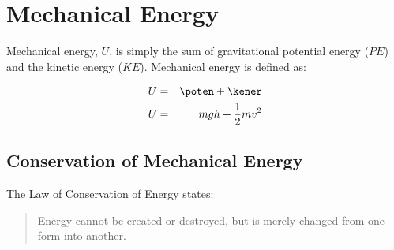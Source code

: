 \section{Mechanical Energy}
Mechanical energy, $U$, is simply the sum of gravitational potential energy ($PE$) and the kinetic energy ($KE$). Mechanical energy is defined as:

\begin{eqnarray}
U &=&\poten + \kener \nonumber \\
\label{eq:pg:mechanical}
U &=& mgh +\frac{1}{2}mv^2
\end{eqnarray}

\subsection{Conservation of Mechanical Energy}

The Law of Conservation of Energy states:
\begin{quote}
Energy cannot be created or destroyed, but is merely changed from one form into another.
\end{quote}


